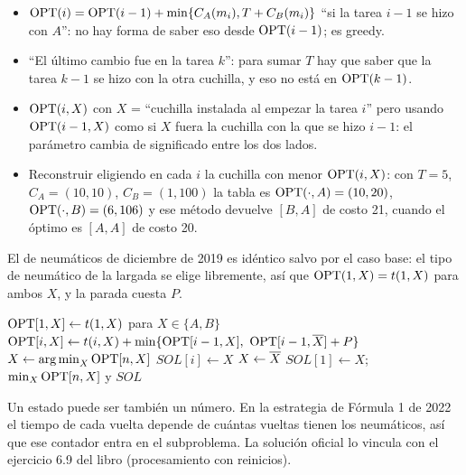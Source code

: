 \begin{trampa}
\begin{itemize}[leftmargin=1.2em]
  \item $\mathrm{OPT}(i)=\mathrm{OPT}(i-1)+\min\{C_A(m_i),T+C_B(m_i)\}$ ``si la tarea $i-1$
  se hizo con $A$'': no hay forma de saber eso desde $\mathrm{OPT}(i-1)$; es greedy.
  \item ``El último cambio fue en la tarea $k$'': para sumar $T$ hay que
  saber que la tarea $k-1$ se hizo con la otra cuchilla, y eso no está en
  $\mathrm{OPT}(k-1)$.
  \item $\mathrm{OPT}(i,X)$ con $X$ = ``cuchilla instalada al empezar la tarea $i$''
  pero usando $\mathrm{OPT}(i-1,X)$ como si $X$ fuera la cuchilla con la que se hizo
  $i-1$: el parámetro cambia de significado entre los dos lados.
  \item Reconstruir eligiendo en cada $i$ la cuchilla con menor $\mathrm{OPT}(i,X)$:
  con $T=5$, $C_A=(10,10)$, $C_B=(1,100)$ la tabla es
  $\mathrm{OPT}(\cdot,A)=(10,20)$, $\mathrm{OPT}(\cdot,B)=(6,106)$ y ese método devuelve
  $[B,A]$ de costo 21, cuando el óptimo es $[A,A]$ de costo 20.
\end{itemize}
\end{trampa}

El de neumáticos de diciembre de 2019 es idéntico salvo por el caso base: el
tipo de neumático de la largada se elige libremente, así que
$\mathrm{OPT}(1,X)=t(1,X)$ para ambos $X$, y la parada cuesta
$P$.

\begin{algorithmic}[1]
\State $\mathrm{OPT}[1,X]\gets t(1,X)$ para $X\in\{A,B\}$
    \State $\OPT[i,X]\gets t(i,X)+\min\{\OPT[i-1,X],\ \OPT[i-1,\pdbar{X}]+P\}$
  \EndFor
\EndFor
\State $X\gets\operatorname*{arg\,min}_{X}\mathrm{OPT}[n,X]$
  \State $\mathit{SOL}[i]\gets X$
   $X\gets\overline{X}$ \EndIf
\EndFor
\State $\mathit{SOL}[1]\gets X$;\ \Return $\min_X\mathrm{OPT}[n,X]$ y $SOL$
\end{algorithmic}

Un estado puede ser también un número. En la estrategia de Fórmula 1 de 2022
el tiempo de cada vuelta depende de cuántas vueltas tienen los neumáticos,
así que ese contador entra en el subproblema. La solución oficial lo vincula
con el ejercicio 6.9 del libro (procesamiento con reinicios).

